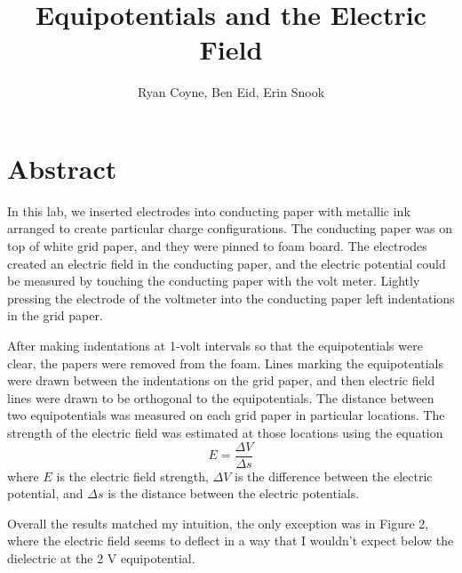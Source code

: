 \documentclass[12pt]{article}
\begin{document}
    \title{Equipotentials and the Electric Field}
    \author{Ryan Coyne, Ben Eid, Erin Snook}
    \maketitle

    \section{Abstract}
        In this lab, we inserted electrodes into conducting paper with metallic ink arranged to create particular charge configurations. The conducting paper was on top of white grid paper, and they were pinned to foam board. The electrodes created an electric field in the conducting paper, and the electric potential could be measured by touching the conducting paper with the volt meter. Lightly pressing the electrode of the voltmeter into the conducting paper left indentations in the grid paper. 
        
        After making indentations at 1-volt intervals so that the equipotentials were clear, the papers were removed from the foam. Lines marking the equipotentials were drawn between the indentations on the grid paper, and then electric field lines were drawn to be orthogonal to the equipotentials. The distance between two equipotentials was measured on each grid paper in particular locations. The strength of the electric field was estimated at those locations using the equation
        \begin{equation*}
            E = \frac{\Delta V}{\Delta s}
        \end{equation*}
        where \(E\) is the electric field strength, \(\Delta V\) is the difference between the electric potential, and \(\Delta s\) is the distance between the electric potentials.

        Overall the results matched my intuition, the only exception was in Figure 2, where the electric field seems to deflect in a way that I wouldn't expect below the dielectric at the 2 V equipotential.
\end{document}
